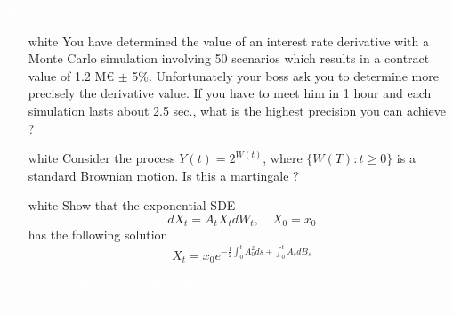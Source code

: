 \documentclass{beamer}
\begin{document}
\begin{homework}
\begin{frame}{\textcolor{white}{Homework}}
\begin{itemize}
\item[white]  You have determined the value of an interest rate derivative with a Monte Carlo simulation involving 50 scenarios which results in a contract value of 1.2 M€ $\pm$ 5\%. Unfortunately your boss ask you to determine more precisely the derivative value. If you have to meet him in 1 hour and each simulation lasts about 2.5 sec., what is the highest precision you can achieve ?
\item[white] Consider the process $Y(t) = 2^{W(t)}$, where $\{W(T):t\geq 0\}$ is a standard Brownian motion. Is this a martingale ?
\item[white]  Show that the exponential SDE
\begin{equation*}
dX_t = A_t X_tdW_t,\quad X_0=x_0
\end{equation*}
has the following solution
\begin{equation*}
X_t = x_0 e^{-\frac{1}{2}\int_0^t A_0^2 ds+\int_0^t A_s dB_s}
\end{equation*}
\end{itemize}
\textcolor{white}{Exercises for this part involves: SDE solving, martingale definition, Ito's lemma, and a bit of Monte Carlo theory.}
\end{frame}
\end{homework}
\end{document}
